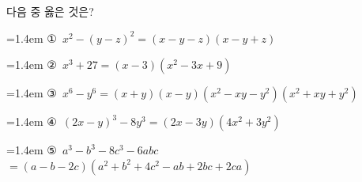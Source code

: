 다음 중 옳은 것은?
\par\medskip\par\noindent\hangindent=1.4em {\small ①}\ $x^2-(y-z)^2=(x-y-z)(x-y+z)$\par\noindent\hangindent=1.4em {\small ②}\ $x^3+27=(x-3)(x^2-3x+9)$\par\noindent\hangindent=1.4em {\small ③}\ $x^6-y^6=(x+y)(x-y)(x^2-xy-y^2)(x^2+xy+y^2)$\par\noindent\hangindent=1.4em {\small ④}\ $(2x-y)^3-8y^3=(2x-3y)(4x^2+3y^2)$\par\noindent\hangindent=1.4em {\small ⑤}\ $a^3-b^3-8c^3-6abc$\\ $=(a-b-2c)(a^2+b^2+4c^2-ab+2bc+2ca)$\par\medskip
